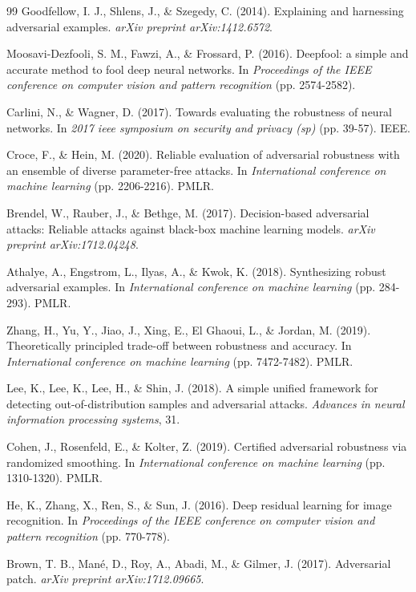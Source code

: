 \documentclass[12pt, a4paper]{article}
\begin{document}
\newpage
\begin{thebibliography}{99}
Goodfellow, I. J., Shlens, J., \& Szegedy, C. (2014). Explaining and harnessing adversarial examples. \textit{arXiv preprint arXiv:1412.6572}.

Moosavi-Dezfooli, S. M., Fawzi, A., \& Frossard, P. (2016). Deepfool: a simple and accurate method to fool deep neural networks. In \textit{Proceedings of the IEEE conference on computer vision and pattern recognition} (pp. 2574-2582).

Carlini, N., \& Wagner, D. (2017). Towards evaluating the robustness of neural networks. In \textit{2017 ieee symposium on security and privacy (sp)} (pp. 39-57). IEEE.

Croce, F., \& Hein, M. (2020). Reliable evaluation of adversarial robustness with an ensemble of diverse parameter-free attacks. In \textit{International conference on machine learning} (pp. 2206-2216). PMLR.

Brendel, W., Rauber, J., \& Bethge, M. (2017). Decision-based adversarial attacks: Reliable attacks against black-box machine learning models. \textit{arXiv preprint arXiv:1712.04248}.

Athalye, A., Engstrom, L., Ilyas, A., \& Kwok, K. (2018). Synthesizing robust adversarial examples. In \textit{International conference on machine learning} (pp. 284-293). PMLR.

Zhang, H., Yu, Y., Jiao, J., Xing, E., El Ghaoui, L., \& Jordan, M. (2019). Theoretically principled trade-off between robustness and accuracy. In \textit{International conference on machine learning} (pp. 7472-7482). PMLR.

Lee, K., Lee, K., Lee, H., \& Shin, J. (2018). A simple unified framework for detecting out-of-distribution samples and adversarial attacks. \textit{Advances in neural information processing systems}, 31.

Cohen, J., Rosenfeld, E., \& Kolter, Z. (2019). Certified adversarial robustness via randomized smoothing. In \textit{International conference on machine learning} (pp. 1310-1320). PMLR.

He, K., Zhang, X., Ren, S., \& Sun, J. (2016). Deep residual learning for image recognition. In \textit{Proceedings of the IEEE conference on computer vision and pattern recognition} (pp. 770-778).

Brown, T. B., Mané, D., Roy, A., Abadi, M., \& Gilmer, J. (2017). Adversarial patch. \textit{arXiv preprint arXiv:1712.09665}.

\end{thebibliography}
\end{document}

